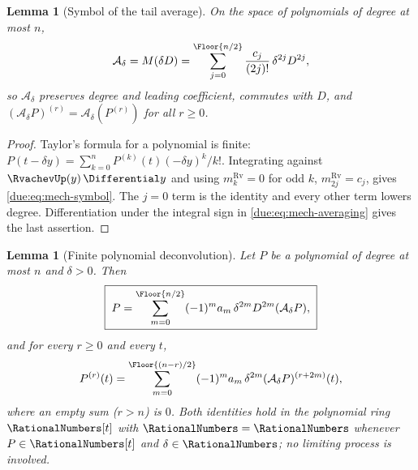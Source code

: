 \documentclass[11pt,oneside]{article}
\theoremstyle{plain}
\newtheorem{lemma}[theorem]{Lemma}
\theoremstyle{definition}
\theoremstyle{remark}
\newcommand{\Kk}{\RationalNumbers}                          %
\newcommand{\am}[1]{a_{#1}}                                 %
\begin{document}
\begin{lemma}[Symbol of the tail average]
\label{due:lem:mech-symbol}
On the space of polynomials of degree at most \(n\),
\begin{equation}
 \mathcal A_\delta=M(\delta D)=\sum_{j=0}^{\Floor{n/2}}\frac{c_j}{(2j)!}\,\delta^{2j}D^{2j},
 \label{due:eq:mech-symbol}
\end{equation}
so \(\mathcal A_\delta\) preserves degree and leading coefficient, commutes
with \(D\), and \((\mathcal A_\delta P)^{(r)}=\mathcal A_\delta(P^{(r)})\) for all
\(r\ge0\).
\end{lemma}

\begin{proof}
Taylor's formula for a polynomial is finite:
\(P(t-\delta y)=\sum_{k=0}^{n}P^{(k)}(t)(-\delta y)^{k}/k!\).  Integrating
against \(\RvachevUp(y)\,\Differential y\) and using
\(m^{\mathrm{Rv}}_k=0\) for odd \(k\), \(m^{\mathrm{Rv}}_{2j}=c_j\), gives
\cref{due:eq:mech-symbol}.  The \(j=0\) term is the identity and every other
term lowers degree.  Differentiation under the integral sign in
\cref{due:eq:mech-averaging} gives the last assertion.
\end{proof}

\begin{lemma}[Finite polynomial deconvolution]
\label{due:lem:mech-finite-inverse}
Let \(P\) be a polynomial of degree at most \(n\) and \(\delta>0\).  Then
\begin{equation}
 \boxed{\;
 P=\sum_{m=0}^{\Floor{n/2}}(-1)^{m}\am{m}\,\delta^{2m}D^{2m}(\mathcal A_\delta P),\;}
 \label{due:eq:mech-finite-inverse}
\end{equation}
and for every \(r\ge0\) and every \(t\),
\begin{equation}
 P^{(r)}(t)=\sum_{m=0}^{\Floor{(n-r)/2}}(-1)^{m}\am{m}\,\delta^{2m}
 (\mathcal A_\delta P)^{(r+2m)}(t),
 \label{due:eq:mech-finite-inverse-jet}
\end{equation}
where an empty sum (\(r>n\)) is \(0\).  Both identities hold in the
polynomial ring \(\Kk[t]\) with \(\Kk=\RationalNumbers\) whenever
\(P\in\RationalNumbers[t]\) and \(\delta\in\RationalNumbers\); no limiting
process is involved.
\end{lemma}
\end{document}
